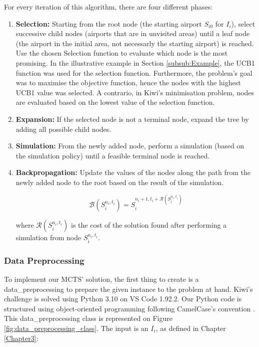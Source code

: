 For every iteration of this algorithm, there are four different phases:

\begin{enumerate}
    \item \textbf{Selection:} Starting from the root node (the starting airport $S_{i0}$ for $I_{i}$), select successive child nodes (airports that are in unvisited areas) until a leaf node (the airport in the initial area, not necessarly the starting airport) is reached. Use the chosen Selection function to evaluate which node is the most promising. In the illustrative example in Section \ref{subsub:Example}, the UCB1 function was used for the selection function. Furthermore, the problem's goal was to maximise the objective function, hence the nodes with the highest UCB1 value was selected. A contrario, in Kiwi's minimisation problem,  nodes are evaluated based on the lowest value of the selection function.

    \item \textbf{Expansion:} If the selected node is not a terminal node, expand the tree by adding all possible child nodes.

    \item \textbf{Simulation:} From the newly added node, perform a simulation (based on the simulation policy) until a feasible terminal node is reached.

    \item \textbf{Backpropagation:} Update the values of the nodes along the path from the newly added node to the root based on the result of the simulation.

          \begin{equation}
              \mathcal{B}(S^{n_i,t_i}_i) = S^{n_i+1,t_i+\mathcal{R}(S^{n_i,t_i}_i)}_i
          \end{equation}

          where $\mathcal{R}(S^{n_i,t_i}_i)$ is the cost of the solution found after performing a simulation from node $S^{n_i,t_i}_i$.
\end{enumerate}


\newpage
\subsubsection{Data Preprocessing}

To implement our MCTS' solution, the first thing to create is a data\_preprocessing  to prepare the given instance to the problem at hand.
Kiwi's challenge is solved using Python 3.10 on VS Code 1.92.2. Our Python code is structured using object-oriented programming following CamelCase's convention \cite{camel_case}. This data\_preprocessing class is represented on Figure \ref{fig:data_preprocessing_class}.
The input is an  $I_i$, as defined in Chapter \ref{Chapter3}:

